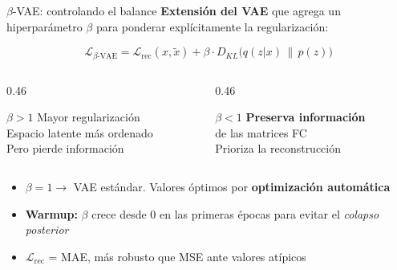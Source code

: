 \documentclass[aspectratio=169, 11pt]{beamer}
\newcommand{\highlight}[1]{\textcolor{uncaccent}{\textbf{#1}}}
\begin{document}
\begin{frame}{$\beta$-VAE: controlando el balance}
  \textbf{Extensión del VAE} que agrega un hiperparámetro $\beta$ para ponderar explícitamente la regularización:

  \[
    \mathcal{L}_{\beta\text{-VAE}} = \mathcal{L}_{\text{rec}}(x, \tilde{x}) + \beta \cdot D_{KL}\big(q(z|x) \,\|\, p(z)\big)
  \]

  \begin{columns}[T]
    \begin{column}{0.46\textwidth}
      \begin{block}{$\beta > 1$}
        Mayor regularización\\
        Espacio latente más ordenado\\
        Pero pierde información
      \end{block}
    \end{column}
    \begin{column}{0.46\textwidth}
      \begin{block}{$\beta < 1$}
        \highlight{Preserva información}\\de las matrices FC\\
        Prioriza la reconstrucción
      \end{block}
    \end{column}
  \end{columns}

  \vspace{0.15cm}
  {\small
  \begin{itemize}\setlength{\itemsep}{1pt}
    \item $\beta = 1 \rightarrow$ VAE estándar. Valores óptimos por \textbf{optimización automática}
    \item \textbf{Warmup:} $\beta$ crece desde 0 en las primeras épocas para evitar el \textit{colapso posterior}
    \item $\mathcal{L}_{\text{rec}}$ = MAE, más robusto que MSE ante valores atípicos
  \end{itemize}}
\end{frame}
\end{document}
